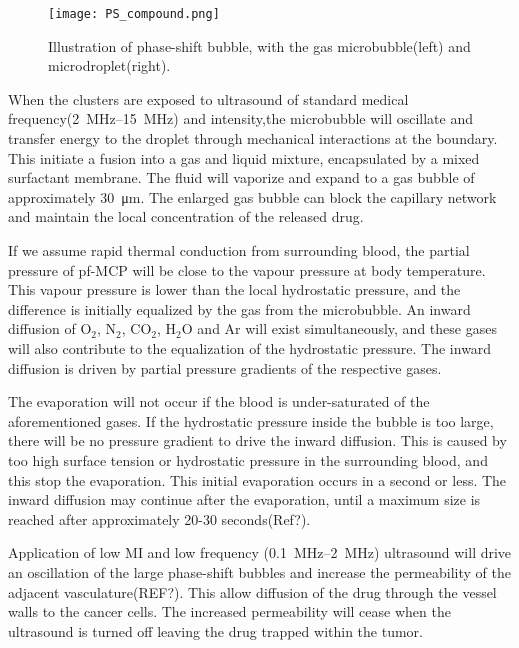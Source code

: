 \begin{figure}[h]
  \centering
  \label{Fig:Sonazoid}
  \texttt{[image: PS\_compound.png]}
  \caption{Illustration of phase-shift bubble, with the gas microbubble(left) and microdroplet(right).}
\end{figure}


When the clusters are exposed to ultrasound of standard medical frequency(\SIrange{2}{15}{\mega\hertz}\cite{Hoskins2010}) and intensity,the microbubble will oscillate and transfer energy to the droplet through mechanical interactions at the boundary. This initiate a fusion into a gas and liquid mixture, encapsulated by a mixed surfactant membrane. The fluid will vaporize and expand to a gas bubble of approximately \SI{30}{\micro\metre}. The enlarged gas bubble can block the capillary network and maintain the local concentration of the released drug. 

If we assume rapid thermal conduction from surrounding blood, the partial pressure of pf-MCP will be close to the vapour pressure at body temperature. This vapour pressure is lower than the local hydrostatic pressure, and the difference is initially equalized by the gas from the microbubble. An inward diffusion of $\mathrm{O}_2$, $\mathrm{N}_2$, $\mathrm{CO}_2$, $\mathrm{H}_2\mathrm{O}$ and $\mathrm{Ar}$ will exist simultaneously, and these gases will also contribute to the equalization of the hydrostatic pressure. The inward diffusion is driven by partial pressure gradients of the respective gases. 

The evaporation will not occur if the blood is under-saturated of the aforementioned gases. If the hydrostatic pressure inside the bubble is too large, there will be no pressure gradient to drive the inward diffusion. This is caused by too high surface tension or hydrostatic pressure in the surrounding blood, and this stop the evaporation. This initial evaporation occurs in a second or less\cite{Healey2013}. The inward diffusion may continue after the evaporation, until a maximum size is reached after approximately 20-30 seconds(Ref?).



Application of low MI and low frequency (\SIrange{0.1}{2}{\mega\hertz}) ultrasound will drive an oscillation of the large phase-shift bubbles and increase the permeability of the adjacent vasculature(REF?). This allow diffusion of the drug through the vessel walls to the cancer cells. The increased permeability will cease when the ultrasound is turned off leaving the drug trapped within the tumor.


